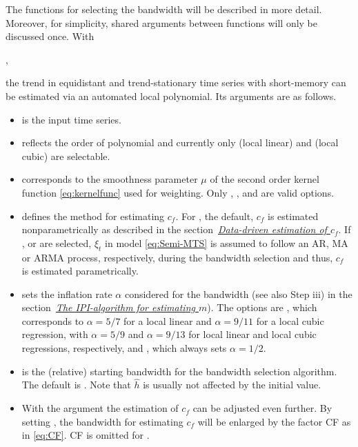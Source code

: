 The functions for selecting the bandwidth will be described in more detail. Moreover, for simplicity, shared arguments between functions will only be discussed once. With 
\vspace{-2mm}
\begin{center}
, 
\end{center}
\vspace{-2mm} 
\noindent
the trend in equidistant and trend-stationary time series with short-memory can be estimated via an automated local polynomial. Its arguments are as follows.
\begin{itemize}
	\item {} is the input time series.
	\item {} reflects the order of polynomial and currently only  (local linear) and  (local cubic) are selectable.
	\item {} corresponds to the smoothness parameter $\mu$ of the second order kernel function \eqref{eq:kernelfunc} used for weighting. Only , ,  and  are valid options.
	\item {} defines the method for estimating $c_f$. For , the default, $c_f$ is estimated nonparametrically as described in the section~\hyperref[sec:cfEst]{\emph{Data-driven estimation of $c_f$}}. If ,  or  are selected, $\xi_t$ in model \eqref{eq:Semi-MTS} is assumed to follow an AR, MA or ARMA process, respectively, during the bandwidth selection and thus, $c_f$ is estimated parametrically. 
	\item {} sets the inflation rate $\alpha$ considered for the bandwidth (see also Step iii) in the section~\hyperref[sec:trendEst]{\emph{The IPI-algorithm for estimating $m$}}). The options are , which corresponds to $\alpha = 5/7$ for a local linear and $\alpha = 9/11$ for a local cubic regression,  with $\alpha = 5/9$ and $\alpha = 9/13$ for local linear and local cubic regressions, respectively, and , which always sets $\alpha = 1/2$.
	\item {} is the (relative) starting bandwidth for the bandwidth selection algorithm. The default is . Note that $\hat{h}$ is usually not affected by the initial value.
	\item With the argument  the estimation of $c_f$ can be adjusted even further. By setting , the bandwidth for estimating $c_f$ will be enlarged by the factor CF as in \eqref{eq:CF}. CF is omitted for .

\end{itemize}
